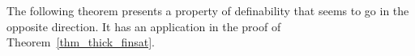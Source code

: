 





The following theorem presents a property of definability that seems to go in the opposite direction.
It has an application in the proof of Theorem~\ref{thm_thick_finsat}.


